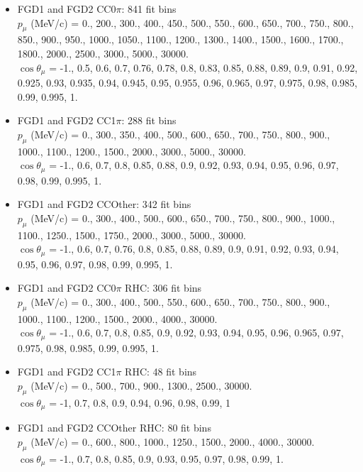\begin{itemize}
  \item FGD1 and FGD2 CC0$\pi$: 841 fit bins\\
    $p_\mu$ (MeV/c) = 0., 200., 300., 400., 450., 500., 550., 600., 650., 700., 750., 800., 850., 900., 950., 1000., 1050., 1100., 1200., 1300., 1400., 1500., 1600., 1700., 1800., 2000., 2500., 3000., 5000., 30000.\\
    $\cos\theta_\mu$ = -1., 0.5, 0.6, 0.7, 0.76, 0.78, 0.8, 0.83, 0.85, 0.88, 0.89, 0.9, 0.91, 0.92, 0.925, 0.93, 0.935, 0.94, 0.945, 0.95, 0.955, 0.96, 0.965, 0.97, 0.975, 0.98, 0.985, 0.99, 0.995, 1.

  \item FGD1 and FGD2 CC1$\pi$: 288 fit bins\\
    $p_\mu$ (MeV/c) = 0., 300., 350., 400., 500., 600., 650., 700., 750., 800., 900., 1000., 1100., 1200., 1500., 2000., 3000., 5000., 30000.\\
    $\cos\theta_\mu$ = -1., 0.6, 0.7, 0.8, 0.85, 0.88, 0.9, 0.92, 0.93, 0.94, 0.95, 0.96, 0.97, 0.98, 0.99, 0.995, 1.

  \item FGD1 and FGD2 CCOther: 342 fit bins\\
    $p_\mu$ (MeV/c) = 0., 300., 400., 500., 600., 650., 700., 750., 800., 900., 1000., 1100., 1250., 1500., 1750., 2000., 3000., 5000., 30000.\\
    $\cos\theta_\mu$ = -1., 0.6, 0.7, 0.76, 0.8, 0.85, 0.88, 0.89, 0.9, 0.91, 0.92, 0.93, 0.94, 0.95, 0.96, 0.97, 0.98, 0.99, 0.995, 1.

  \item FGD1 and FGD2 CC0$\pi$ RHC: 306 fit bins\\
    $p_\mu$ (MeV/c) = 0., 300., 400., 500., 550., 600., 650., 700., 750., 800., 900., 1000., 1100., 1200., 1500., 2000., 4000., 30000.\\
    $\cos\theta_\mu$ = -1., 0.6, 0.7, 0.8, 0.85, 0.9, 0.92, 0.93, 0.94, 0.95, 0.96, 0.965, 0.97, 0.975, 0.98, 0.985, 0.99, 0.995, 1.

  \item FGD1 and FGD2 CC1$\pi$ RHC: 48 fit bins \\
    $p_\mu$ (MeV/c) = 0., 500., 700., 900., 1300., 2500., 30000.\\
    $\cos\theta_\mu$ = -1, 0.7, 0.8, 0.9, 0.94, 0.96, 0.98, 0.99, 1

  \item FGD1 and FGD2 CCOther RHC: 80 fit bins \\
    $p_\mu$ (MeV/c) = 0., 600., 800., 1000., 1250., 1500., 2000., 4000., 30000.\\
    $\cos\theta_\mu$ = -1., 0.7, 0.8, 0.85, 0.9, 0.93, 0.95, 0.97, 0.98, 0.99, 1.


\end{itemize}

